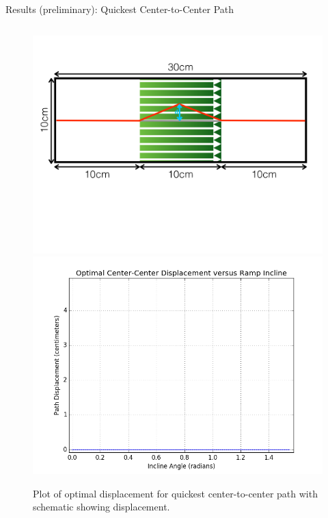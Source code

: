 \begin{frame}{Results (preliminary): Quickest Center-to-Center Path}
\begin{figure}
\begin{columns}[T,onlytextwidth]
\includegraphics[width=\textwidth]{images/optimal_cen_cen_schematic}
\includegraphics[width=\textwidth]{images/optimal_center_center}
\end{columns}
\caption{Plot of optimal displacement for quickest center-to-center path with schematic showing displacement.}
\end{figure}
\end{frame}

